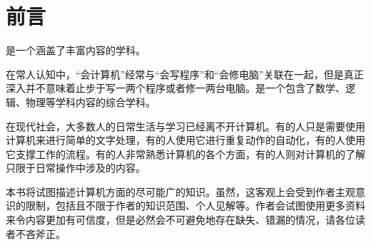 \chapter*{前言}\label{ch:Preface}
    \cst 是一个涵盖了丰富内容的学科。

    在常人认知中，“会计算机”经常与“会写程序”和“会修电脑”关联在一起，但是真正深入\cst 并不意味着止步于写一两个程序或者修一两台电脑。\cst 是一个包含了数学、逻辑、物理等学科内容的综合学科。

    在现代社会，大多数人的日常生活与学习已经离不开计算机。有的人只是需要使用计算机来进行简单的文字处理，有的人使用它进行重复动作的自动化，有的人使用它支撑工作的流程。有的人非常熟悉计算机的各个方面，有的人则对计算机的了解只限于日常操作中涉及的内容。

    本书将试图描述计算机方面的尽可能广的知识。虽然，这客观上会受到作者主观意识的限制，包括且不限于作者的知识范围、个人见解等。作者会试图使用更多资料来令内容更加有可信度，但是必然会不可避免地存在缺失、错漏的情况，请各位读者不吝斧正。
